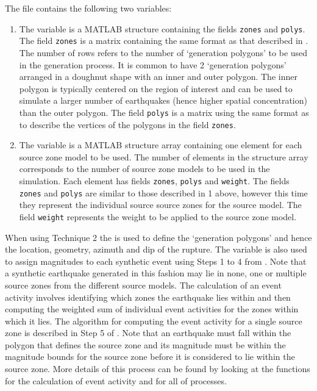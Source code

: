 The  file contains
the following two variables:
\begin{enumerate}
\item The  variable is a MATLAB structure
containing the fields \texttt{zones} and \texttt{polys}. The field
\texttt{zones} is a matrix containing the same format as that
described in . The number of
rows refers to the number of `generation polygons' to be used in
the generation process. It is common to have 2 `generation
polygons' arranged in a doughnut shape with an inner and outer
polygon. The inner polygon is typically centered on the region of
interest and can be used to simulate a larger number of
earthquakes (hence higher spatial concentration) than the outer
polygon. The field \texttt{polys} is a matrix using the same
format as  to describe the
vertices of the polygons in the field \texttt{zones}. \item The
 variable is a MATLAB structure array
containing one element for each source zone model to be used. The
number of elements in the  structure array
corresponds to the number of source zone models to be used in the
simulation. Each element has fields \texttt{zones}, \texttt{polys}
and \texttt{weight}. The fields \texttt{zones} and \texttt{polys}
are similar to those described in 1 above, however this time they
represent the individual source source zones for the source model.
The field \texttt{weight} represents the weight to be applied to
the source zone model.
\end{enumerate}

When using Technique 2 the  is used to
define the `generation polygons' and hence the location, geometry,
azimuth and dip of the rupture. The variable
 is also used to assign magnitudes to each
synthetic event using Steps 1 to 4 from
. Note that a synthetic earthquake
generated in this fashion may lie in none, one or multiple source
zones from the different source models. The calculation of an
event activity involves identifying which zones the earthquake
lies within and then computing the weighted sum of individual
event activities for the zones within which it lies. The algorithm
for computing the event activity for a single source zone is
described in Step 5 of . Note that
an earthquake must fall within the polygon that defines the source
zone and its magnitude must be within the magnitude bounds for the
source zone before it is considered to lie within the source zone.
More details of this process can be found by looking at the
functions  for the calculation
of event activity and  for all of
processes.

